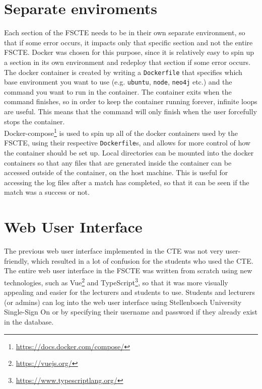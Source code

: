 \documentclass[a4paper, 12pt]{report}
\begin{document}
\section{Separate enviroments}

Each section of the FSCTE needs to be in their own separate environment, so that
if some error occurs, it impacts only that specific section and not the entire
FSCTE. Docker was chosen for this purpose, since it is relatively easy to spin
up a section in its own environment and redeploy that section if some error
occurs. \\

The docker container is created by writing a \texttt{Dockerfile} that
specifies which base environment you want to use (e.g. \texttt{ubuntu},
\texttt{node}, \texttt{neo4j} etc.) and the command you want to run in the
container. The container exits when the command finishes, so in order to keep
the container running forever, infinite loops are useful. This means that the
command will only finish when the user forcefully stops the container. \\

Docker-compose\footnote{\url{https://docs.docker.com/compose/}} is used to spin
up all of the docker containers used by the FSCTE,
using their respective \texttt{Dockerfile}s, and allows for more control of how
the container should be set up. Local directories can be mounted into the docker
containers so that any files that are generated inside the container can be
accessed outside of the container, on the host machine. This is useful for
accessing the log files after a match has completed, so that it can be seen if
the match was a success or not.

\section{Web User Interface}

The previous web user interface implemented in the CTE was not very user-friendly,
which resulted in a lot of confusion for the students who used the CTE. The entire
web user interface in the FSCTE was written from scratch using new technologies,
such as Vue\footnote{\url{https://vuejs.org/}} and
TypeScript\footnote{\url{https://www.typescriptlang.org/}}, so that it was more
visually appealing and easier for the lecturers and students to use. Students
and lecturers (or admins) can log into the web user interface using Stellenbosch
University Single-Sign On or by specifying their username and password if they
already exist in the database. \\
\end{document}

